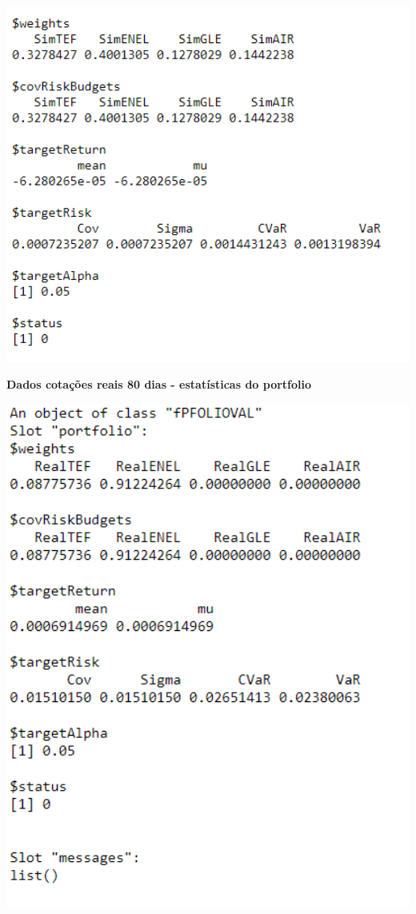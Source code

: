 \documentclass[
  12pt,
  a4paper,
  openany]{book}
\theoremstyle{definition}
\theoremstyle{definition}
\theoremstyle{definition}
\theoremstyle{remark}
\begin{document}
\begin{center}
\begin{minipage}{0.90\linewidth}
    \centering
    \includegraphics[width=2\textwidth]{image/vi.png}
\end{minipage}
\end{center}


\newpage

\begin{center}
 {\normalfont\Large\bfseries Dados cotações reais 80 dias -  estatísticas do portfolio}
\end{center}

\begin{center}
\begin{minipage}{0.90\linewidth}
    \centering
    \includegraphics[width=2\textwidth]{image/realport.png}
\end{minipage}
\end{center}
\end{document}
